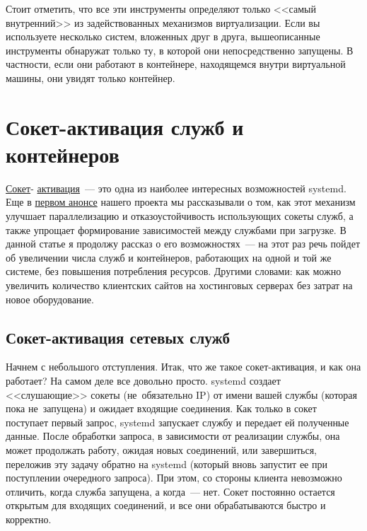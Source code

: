 \documentclass[10pt,oneside,a4paper]{article}
\begin{document}
Стоит отметить, что все эти инструменты определяют только <<самый внутренний>>
из задействованных механизмов виртуализации. Если вы используете несколько
систем, вложенных друг в друга, вышеописанные инструменты обнаружат только ту, в
которой они непосредственно запущены. В частности, если они работают в
контейнере, находящемся внутри виртуальной машины, они увидят только контейнер.

\section{Сокет-активация служб и контейнеров}

\href{http://0pointer.de/blog/projects/socket-activation.html}{Сокет}-%
\href{http://0pointer.de/blog/projects/socket-activation2.html}{активация}~---
это одна из наиболее интересных возможностей systemd. Еще в
\href{http://0pointer.de/blog/projects/systemd.html}{первом анонсе} нашего
проекта мы рассказывали о том, как этот механизм улучшает
параллелизацию и отказоустойчивость использующих сокеты служб, а также упрощает
формирование зависимостей между службами при загрузке. В данной статье я
продолжу рассказ о его возможностях~--- на этот раз речь пойдет об увеличении
числа служб и контейнеров, работающих на одной и той же системе, без повышения
потребления ресурсов. Другими словами: как можно увеличить количество клиентских
сайтов на хостинговых серверах без затрат на новое оборудование.

\subsection{Сокет-активация сетевых служб}

Начнем с небольшого отступления. Итак, что же такое сокет-активация, и как она
работает? На самом деле все довольно просто. systemd создает <<слушающие>>
сокеты (не~обязательно IP) от имени вашей службы (которая пока не~запущена) и
ожидает входящие соединения. Как только в сокет поступает первый запрос, systemd
запускает службу и передает ей полученные данные. После обработки запроса, в
зависимости от реализации службы, она может продолжать работу, ожидая новых
соединений, или завершиться, переложив эту задачу обратно на systemd (который
вновь запустит ее при поступлении очередного запроса). При этом, со стороны
клиента невозможно отличить, когда служба запущена, а когда~--- нет. Сокет
постоянно остается открытым для входящих соединений, и все они обрабатываются
быстро и корректно.
\end{document}
